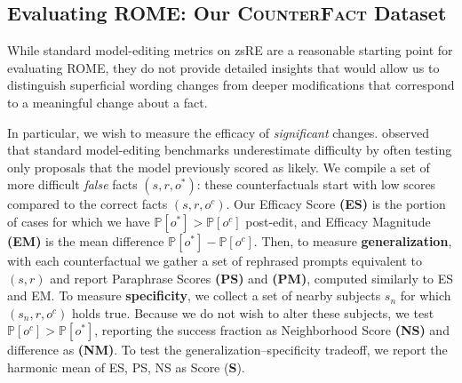 \documentclass{article}
\newcommand{\cfd}{\textsc{CounterFact}\xspace}
\newcommand{\method}{ROME\xspace}
\begin{document}
\subsection{Evaluating \method: Our \cfd Dataset} %
\label{subsec:counterfact-description}

While standard model-editing metrics on zsRE are a reasonable starting point for evaluating \method, they do not provide detailed insights that would allow us to distinguish superficial wording changes from deeper modifications that correspond to a meaningful change about a fact.

In particular, we wish to measure the efficacy of \textit{significant} changes.  \cite{hase2021language} observed that standard model-editing benchmarks underestimate difficulty by often testing only proposals that the model previously scored as likely.  We compile a set of more difficult \textit{false} facts $(s, r, o^*)$: these counterfactuals start with low scores compared to the correct facts $(s, r, o^c)$.
Our Efficacy Score \textbf{(ES)} is the portion of cases for which we have $\mathbb{P}[o^*] > \mathbb{P}[o^c]$  post-edit, and Efficacy Magnitude \textbf{(EM)} is the mean difference $\mathbb{P}[o^*] - \mathbb{P}[o^c]$. Then, to measure \textbf{generalization}, with each counterfactual we gather a set of rephrased prompts equivalent to $(s, r)$ and report Paraphrase Scores \textbf{(PS)} and \textbf{(PM)}, computed similarly to ES and EM. To measure \textbf{specificity}, we collect a set of nearby subjects $s_n$ for which $(s_n, r, o^c)$ holds true. Because we do not wish to alter these subjects, we test $\mathbb{P}[o^c] > \mathbb{P}[o^*]$, reporting the success fraction as Neighborhood Score \textbf{(NS)} and difference as \textbf{(NM)}. To test the generalization--specificity tradeoff, we report the harmonic mean of ES, PS, NS as Score (\textbf{S}).
\end{document}
